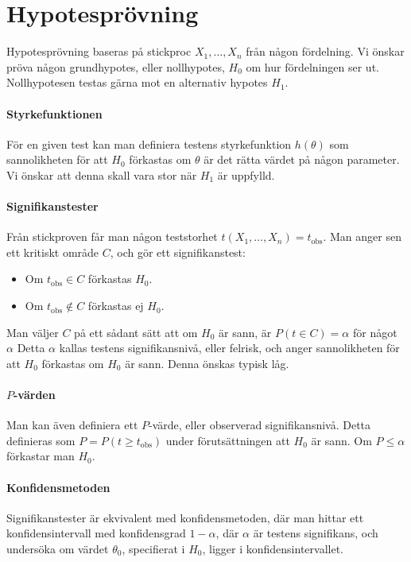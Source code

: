 \section{Hypotesprövning}
Hypotesprövning baseras på stickproc $X_1, \dots, X_n$ från någon fördelning. Vi önskar pröva någon grundhypotes, eller nollhypotes, $H_0$ om hur fördelningen ser ut. Nollhypotesen testas gärna mot en alternativ hypotes $H_1$.

\paragraph{Styrkefunktionen}
För en given test kan man definiera testens styrkefunktion $h(\theta)$ som sannolikheten för att $H_0$ förkastas om $\theta$ är det rätta värdet på någon parameter. Vi önskar att denna skall vara stor när $H_1$ är uppfylld.

\paragraph{Signifikanstester}
Från stickproven får man någon teststorhet $t(X_1, \dots, X_n) = t_\text{obs}$. Man anger sen ett kritiskt område $C$, och gör ett signifikanstest:
\begin{itemize}
	\item Om $t_\text{obs}\in C$ förkastas $H_0$.
	\item Om $t_\text{obs}\not\in C$ förkastas ej $H_0$.
\end{itemize}
Man väljer $C$ på ett sådant sätt att om $H_0$ är sann, är $P(t\in C) = \alpha$ för något $\alpha$ Detta $\alpha$ kallas testens signifikansnivå, eller felrisk, och anger sannolikheten för att $H_0$ förkastas om $H_0$ är sann. Denna önskas typisk låg.

\paragraph{$P$-värden}
Man kan även definiera ett $P$-värde, eller observerad signifikansnivå. Detta definieras som $P = P(t\geq t_\text{obs})$ under förutsättningen att $H_0$ är sann. Om $P\leq\alpha$ förkastar man $H_0$.

\paragraph{Konfidensmetoden}
Signifikanstester är ekvivalent med konfidensmetoden, där man hittar ett konfidensintervall med konfidensgrad $1 - \alpha$, där $\alpha$ är testens signifikans, och undersöka om värdet $\theta_0$, specifierat i $H_0$, ligger i konfidensintervallet.

